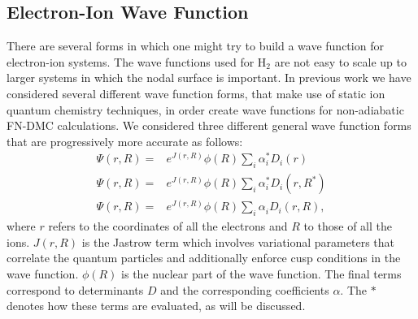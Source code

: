 \documentclass[aip,jcp,numerical,reprint]{revtex4-1}
\begin{document}
\subsection{Electron-Ion Wave Function}
 There are several forms in which one might try to build a wave function for electron-ion systems.  The wave functions used for H$_{2}$ are not easy to scale up to larger systems in which the nodal surface is important.   %
In previous work we have considered several different wave function forms, that make use of static ion quantum chemistry techniques, in order create wave functions for non-adiabatic FN-DMC calculations. 
We considered three different general wave function forms that are progressively more accurate as follows:
\begin{align}
\Psi(r,R) =& e^{J(r,R)}\phi(R)\sum_{i}\alpha^{*}_{i} D_{i}(r) \label{eqn:wfs1}\\
\Psi(r,R) =&e^{J(r,R)}\phi(R)\sum_{i}\alpha^{*}_{i} D_{i}(r,R^{*}) \label{eqn:wfs2}\\
\Psi(r,R) =& e^{J(r,R)}\phi(R)\sum_{i}\alpha^{}_{i} D_{i}(r,R), \label{eqn:wfs3}
\end{align}
where $r$ refers to the coordinates of all the electrons and $R$ to those of all the ions.  $J(r,R)$ is the Jastrow term which involves variational parameters that correlate the quantum particles and additionally  enforce cusp conditions in the wave function.  $\phi(R)$ is the nuclear part of the wave function. The final terms correspond to determinants $D$ and the corresponding coefficients $\alpha$.    The $*$ denotes how these terms are evaluated, as will be discussed. 
\end{document}
